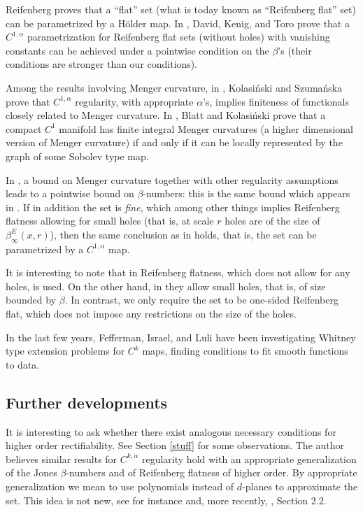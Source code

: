 \documentclass[11pt, twoside, leqno]{article}
\numberwithin{equation}{section}
\theoremstyle{plain}
\theoremstyle{definition}
\begin{document}
Reifenberg \cite{reifen} proves that a ``flat'' set (what is today known as ``Reifenberg flat'' set) can be parametrized by a H\"older map. 
In   \cite{DKT}, David, Kenig, and Toro prove that a $C^{1,\alpha}$ parametrization for Reifenberg flat sets (without holes) with vanishing constants can be achieved under a pointwise condition on the $\beta$'s (their conditions are stronger than our conditions).

Among the results involving Menger curvature, in \cite{polish}, Kolasi\'{n}ski and Szuma\'{n}ska prove that $C^{1,\alpha}$ regularity, with appropriate $\alpha$'s, implies finiteness of functionals closely related to Menger curvature. In \cite{blatt}, Blatt and Kolasi\'{n}ski prove that a compact $C^1$ manifold has finite integral Menger curvatures (a higher dimensional version of Menger curvature) if and only if it can be locally represented by the graph of some Sobolev type map. 

In \cite{kola2}, a bound on Menger curvature together with other regularity assumptions leads to a pointwise bound on $\beta$-numbers: this is the same bound which appears in \cite{DKT}. If in addition the set is \emph{fine}, which among other things implies Reifenberg flatness allowing for small holes (that is, at scale $r$ holes are of the size of $\beta^E_{\infty}(x,r)$), then the same conclusion as in \cite{DKT} holds, that is, the set can be parametrized by a $C^{1,\alpha}$ map.

It is interesting to note that in \cite{DKT} Reifenberg flatness, which does not allow for any holes, is used. On the other hand, in \cite{kola2} they allow small holes, that is, of size  bounded by $\beta$. In contrast, we only require the set to be one-sided Reifenberg flat, which does not impose any restrictions on the size of the holes.

In the last few years, Fefferman, Israel, and Luli   \cite{fefferman} have been investigating Whitney type extension problems for $C^k$ maps, finding conditions to fit smooth functions to data.

\subsection{Further developments}

It is interesting to ask whether there exist analogous necessary conditions for higher order rectifiability. See Section \ref{stuff} for some observations. The author believes similar results for $C^{k,\alpha}$ regularity hold with an appropriate generalization of the Jones $\beta$-numbers and of Reifenberg flatness of higher order. By appropriate generalization we mean to use polynomials instead of $d$-planes to approximate the set. This idea is not new, see for instance \cite{dorronsoro1, dorronsoro2} and, more recently, \cite{marti}, Section 2.2.
\end{document}
